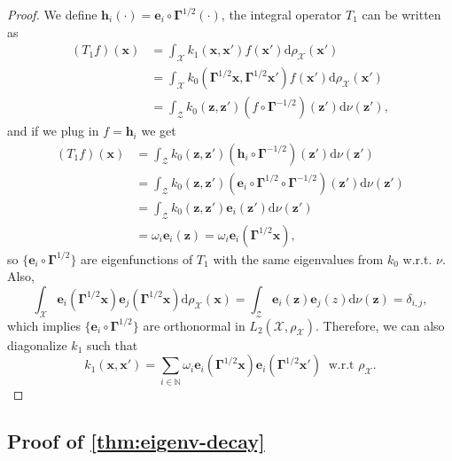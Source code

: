 \begin{proof}
    We define $\bm h_i(\cdot) = \bm e_i \circ \bm \Gamma^{1/2}(\cdot)$, the integral operator $T_1$ can be written as
    \begin{align*}
        (T_1 f)(\bm x) &= \int_{\mathcal X} k_1(\bm x, \bm x')f(\bm x') \mathrm d\rho_{\mathcal X}(\bm x') \\
        & = \int_\mathcal X k_0(\bm \Gamma^{1/2}\bm x, \bm \Gamma ^{1/2}\bm x') f(\bm x') \mathrm d\rho_{\mathcal X}(\bm x')\\
        & = \int_\mathcal Z k_0(\bm z, \bm z') (f\circ \bm \Gamma^{-1/2}) ( \bm z') \mathrm d \nu(\bm z'),
    \end{align*}
    and if we plug in $f = \bm h_i$ we get
    \begin{align*}
        (T_1 f)(\bm x) &= \int_\mathcal Z k_0(\bm z, \bm z') (\bm h_i\circ \bm \Gamma^{-1/2}) ( \bm z') \mathrm d \nu(\bm z')\\
        &= \int_\mathcal Z k_0(\bm z, \bm z') (\bm e_i \circ \bm \Gamma ^{1/2}\circ \bm \Gamma^{-1/2}) ( \bm z') \mathrm d \nu(\bm z')\\
        &= \int_\mathcal Z k_0(\bm z, \bm z') \bm e_i( \bm z') \mathrm d \nu(\bm z')\\
        & = \omega_i \bm e_i(\bm z) = \omega_i \bm e_i(\bm \Gamma^{1/2}\bm x),
    \end{align*}
    so $\{\bm e_i\circ \bm \Gamma ^{1/2}\}$ are eigenfunctions of $T_1$ with the same eigenvalues from $k_0$ w.r.t. $\nu$. Also, 
    \[
        \int_\mathcal X \bm e_i(\bm \Gamma^{1/2}\bm x) \bm e_j(\bm \Gamma^{1/2}\bm x) \mathrm d\rho_{\mathcal X}(\bm x) = \int_{\mathcal Z}  \bm e_i(\bm z) \bm e_j(z) \mathrm d\nu(\bm z) = \delta_{i,j},
    \]
    which implies $\{\bm e_i\circ \bm \Gamma ^{1/2}\}$ are orthonormal in $L_2(\mathcal X, \rho_{\mathcal X})$. Therefore, we can also diagonalize $k_1$ such that 
    \[
        k_1(\bm x, \bm x') = \sum_{i\in \mathbb N} \omega_i \bm e_i(\bm \Gamma^{1/2}\bm x)\bm e_i(\bm \Gamma^{1/2}\bm x') \ \text{ w.r.t $\rho_{\mathcal X}$}.
    \]    
\end{proof}

\subsection{Proof of \cref{thm:eigenv-decay}}\label{app:thm-eigenv-decay}


